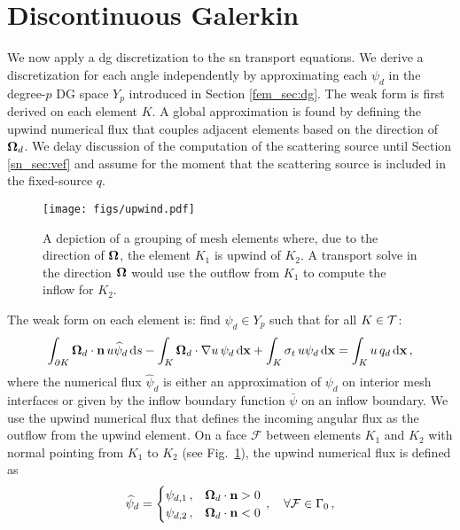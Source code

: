 \documentclass[../doc.tex]{subfiles}
\begin{document}
\section{Discontinuous Galerkin}
We now apply a \gls{dg} discretization to the \gls{sn} transport equations. We derive a discretization for each angle independently by approximating each $\psi_d$ in the degree-$p$ DG space $Y_p$ introduced in Section \ref{fem_sec:dg}. The weak form is first derived on each element $K$. A global approximation is found by defining the upwind numerical flux that couples adjacent elements based on the direction of $\boldsymbol{\Omega}_d$. We delay discussion of the computation of the scattering source until Section \ref{sn_sec:vef} and assume for the moment that the scattering source is included in the fixed-source $q$. 

\begin{figure}
\centering
\texttt{[image: figs/upwind.pdf]}
\caption{A depiction of a grouping of mesh elements where, due to the direction of $\boldsymbol{\Omega}$, the element $K_1$ is upwind of $K_2$. A transport solve in the direction $\boldsymbol{\Omega}$ would use the outflow from $K_1$ to compute the inflow for $K_2$.}
\label{sn:upwind_diag}
\end{figure}
The weak form on each element is: find $\psi_d \in Y_p$ such that for all $K \in \mathcal{T}$: 
	\begin{equation}
		\int_{\partial K} \boldsymbol{\Omega}_d \cdot\boldsymbol{\mathrm{n}}\, u \widehat{\psi}_d \mathop{}\!\mathrm{d} s - \int_K \boldsymbol{\Omega}_d\cdot\nabla u \, \psi_d \mathop{}\!\mathrm{d} \boldsymbol{\mathrm{x}} + \int_K \sigma_t\, u\psi_d \mathop{}\!\mathrm{d} \boldsymbol{\mathrm{x}} = \int_K u\, q_d \mathop{}\!\mathrm{d} \boldsymbol{\mathrm{x}} \,, 
	\end{equation}
where the numerical flux $\widehat{\psi}_d$ is either an approximation of $\psi_d$ on interior mesh interfaces or given by the inflow boundary function $\bar{\psi}$ on an inflow boundary. We use the upwind numerical flux that defines the incoming angular flux as the outflow from the upwind element. On a face $\mathcal{F}$ between elements $K_1$ and $K_2$ with normal pointing from $K_1$ to $K_2$ (see Fig.~\ref{sn:upwind_diag}), the upwind numerical flux is defined as 
	\begin{equation} \label{sn:upwind}
		\widehat{\psi}_d = \begin{cases}
			\psi_{d,1} \,, & \boldsymbol{\Omega}_d\cdot\boldsymbol{\mathrm{n}} > 0 \\
			\psi_{d,2} \,, & \boldsymbol{\Omega}_d\cdot\boldsymbol{\mathrm{n}} < 0 
		\end{cases} \,, \quad \forall \mathcal{F} \in \Gamma_0 \,, 
	\end{equation}
\end{document}
